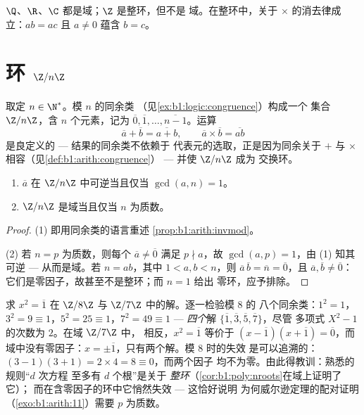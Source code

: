 \begin{example}
$\Q$、$\R$、$\C$ 都是域；$\Z$ 是整环，但不是
域。在整环中，关于 $\times$ 的消去律成立：$ab =
ac$ 且 $a \neq 0$ 蕴含 $b = c$。
\end{example}

\section{环 $\Z/n\Z$}

\begin{definition}\label{def:b1:structures:zn}
取定 $n \in \N^*$。模 $n$ 的同余类
（见\cref{ex:b1:logic:congruence}）构成一个
集合 $\Z/n\Z$，含 $n$ 个元素，记为 $\overline 0,
\overline 1, \dots, \overline{n-1}$。运算
\[
\overline a + \overline b = \overline{a + b},
\qquad
\overline a \times \overline b = \overline{ab}
\]
是良定义的 --- 结果的同余类不依赖于
代表元的选取，正是因为同余关于 $+$
与 $\times$ 相容（见\cref{def:b1:arith:congruence}） --- 并使 $\Z/n\Z$ 成为
交换环。
\end{definition}

\begin{theorem}[$\Z/n\Z$ 的可逆元；域 $\Z/p\Z$]\label{thm:b1:structures:zp}
\begin{enumerate}
  \item $\overline a$ 在 $\Z/n\Z$ 中可逆当且仅当
        $\gcd(a, n) = 1$。
  \item $\Z/n\Z$ 是域当且仅当 $n$ 为质数。
\end{enumerate}
\end{theorem}

\begin{proof}
(1) 即用同余类的语言重述 \cref{prop:b1:arith:invmod}。

(2) 若 $n = p$ 为质数，则每个 $\overline a \neq \overline 0$ 满足 $p
\nmid a$，故 $\gcd(a, p) = 1$，由 (1) 知其可逆 --- 从而是域。若 $n =
ab$，其中 $1 < a, b < n$，则 $\overline a\, \overline b = \overline
n = \overline 0$，且 $\overline a, \overline b \neq \overline 0$：
它们是零因子，故甚至不是整环；而 $n = 1$ 给出
零环，应予排除。
\end{proof}

\begin{example}[$1$ 有几个平方根？]\label{ex:b1:structures:sqrtone}
求 $x^2 = \overline 1$ 在 $\Z/8\Z$ 与 $\Z/7\Z$ 中的解。逐一检验模 $8$ 的
八个同余类：$1^2 = 1$，$3^2 = 9 \equiv 1$，$5^2 = 25
\equiv 1$，$7^2 = 49 \equiv 1$ --- \emph{四个}解
$\{\overline1, \overline3, \overline5, \overline7\}$，尽管
多项式 $X^2 - 1$ 的次数为 $2$。在域 $\Z/7\Z$ 中，
相反，$x^2 = \overline1$ 等价于 $(x - \overline1)(x +
\overline1) = \overline0$，而域中没有零因子：$x =
\pm\overline1$，只有两个解。模 $8$ 时的失效
是可以追溯的：$(3-1)(3+1) = 2 \times 4 = 8 \equiv 0$，而两个因子
均不为零。由此得教训：熟悉的规则“$d$ 次方程
至多有 $d$ 个根”是关于
\emph{整环}（\cref{cor:b1:poly:nroots}在域上证明了它）；
而在含零因子的环中它悄然失效 --- 这恰好说明
为何威尔逊定理的配对证明
（\cref{exo:b1:arith:11}）需要 $p$ 为质数。
\end{example}

